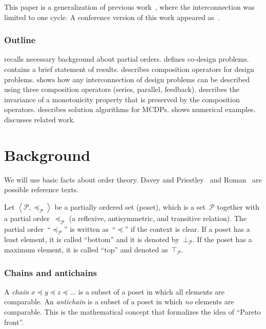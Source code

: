 \documentclass[twocolumn,english]{IEEEtran}
\theoremstyle{definition}
\theoremstyle{plain}
\theoremstyle{definition}
\theoremstyle{remark}
\theoremstyle{definition}
\theoremstyle{plain}
\theoremstyle{plain}
\newcommand{\posleq}{\preceq}
\newcommand{\posA}{\mathcal{P}}
\newcommand{\posAleq}{\mathrel{{\posleq_\posA}}}
\begin{document}
This paper is a generalization of previous work~\cite{censi15monotone},
where the interconnection was limited to one cycle. A conference
version of this work appeared as~\cite{censi15same}.

 

\subsubsection*{Outline}

 recalls necessary background about partial orders.
 defines co-design problems. 
contains a brief statement of results.  describes
composition operators for design problems. 
shows how any interconnection of design problems can be described
using three composition operators (series, parallel, feedback). 
describes the invariance of a monotonicity property that is preserved
by the composition operators.  describes
solution algorithms for MCDPs.  shows
numerical examples.  discusses related
work.



\section{Background\label{sec:Background}}

We will use basic facts about order theory. Davey and Priestley~\cite{davey02}
and Roman~\cite{roman08} are possible reference texts.

Let $\left\langle \posA,\posAleq\right\rangle $ be a partially ordered
set (poset), which is a set~$\posA$ together with a partial order~$\posAleq$
(a reflexive, antisymmetric, and transitive relation). The partial
order~``$\posAleq$'' is written as~``$\posleq$'' if the context
is clear. If a poset has a least element, it is called ``bottom''
and it is denoted by~$\bot_{\posA}$. If the poset has a maximum
element, it is called ``top'' and denoted as~$\top_{\posA}$.

\subsubsection*{Chains and antichains}

A \emph{chain} $x\posleq y\posleq z\posleq\dots$ is a subset of a
poset in which all elements are comparable. An \emph{antichain} is
a subset of a poset in which \emph{no} elements are comparable. This
is the mathematical concept that formalizes the idea of ``Pareto
front''.
\end{document}
